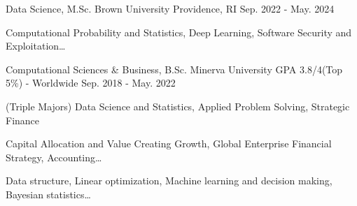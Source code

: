 \begin{cventries}
  \cventry
    {Data Science, M.Sc.}
    {Brown University}
    {Providence, RI}
    {Sep. 2022 - May. 2024}
    {
    \begin{cvitems}
        \item {Computational Probability and Statistics, Deep Learning, Software Security and Exploitation…}
    \end{cvitems}
    }

  \cventry
    {Computational Sciences \& Business, B.Sc.}
    {Minerva University}
    {GPA 3.8/4(Top 5\%) - Worldwide}
    {Sep. 2018 - May. 2022}
    {
      \begin{cvitems}
        \item {(Triple Majors)  Data Science and Statistics, Applied Problem Solving, Strategic Finance}
        \item {Capital Allocation and Value Creating Growth, Global Enterprise Financial Strategy, Accounting…}
        \item {Data structure, Linear optimization, Machine learning and decision making, Bayesian statistics…}
      \end{cvitems}
    }
\end{cventries}
